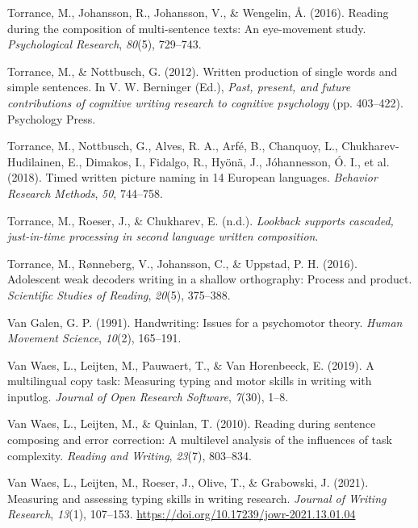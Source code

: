 \documentclass[
  man,floatsintext]{apa7}
\newlength{\cslhangindent}
\newlength{\cslentryspacingunit} %
\newenvironment{CSLReferences}[2] %
 {%
  \setlength{\parindent}{0pt}
  \ifodd #1
  \let\oldpar\par
  \def\par{\hangindent=\cslhangindent\oldpar}
  \fi
  \setlength{\parskip}{#2\cslentryspacingunit}
 }%
 {}
\begin{document}
\begin{CSLReferences}{1}{0}
\leavevmode{}%
Torrance, M., Johansson, R., Johansson, V., \& Wengelin, Å. (2016). Reading during the composition of multi-sentence texts: An eye-movement study. \emph{Psychological Research}, \emph{80}(5), 729--743.

\leavevmode{}%
Torrance, M., \& Nottbusch, G. (2012). Written production of single words and simple sentences. In V. W. Berninger (Ed.), \emph{Past, present, and future contributions of cognitive writing research to cognitive psychology} (pp. 403--422). Psychology Press.

\leavevmode{}%
Torrance, M., Nottbusch, G., Alves, R. A., Arfé, B., Chanquoy, L., Chukharev-Hudilainen, E., Dimakos, I., Fidalgo, R., Hyönä, J., Jóhannesson, Ó. I., et al. (2018). Timed written picture naming in 14 {E}uropean languages. \emph{Behavior Research Methods}, \emph{50}, 744--758.

\leavevmode{}%
Torrance, M., Roeser, J., \& Chukharev, E. (n.d.). \emph{Lookback supports cascaded, just-in-time processing in second language written composition}.

\leavevmode{}%
Torrance, M., Rønneberg, V., Johansson, C., \& Uppstad, P. H. (2016). Adolescent weak decoders writing in a shallow orthography: Process and product. \emph{Scientific Studies of Reading}, \emph{20}(5), 375--388.

\leavevmode{}%
Van Galen, G. P. (1991). Handwriting: Issues for a psychomotor theory. \emph{Human Movement Science}, \emph{10}(2), 165--191.

\leavevmode{}%
Van Waes, L., Leijten, M., Pauwaert, T., \& Van Horenbeeck, E. (2019). A multilingual copy task: Measuring typing and motor skills in writing with inputlog. \emph{Journal of Open Research Software}, \emph{7}(30), 1--8.

\leavevmode{}%
Van Waes, L., Leijten, M., \& Quinlan, T. (2010). Reading during sentence composing and error correction: A multilevel analysis of the influences of task complexity. \emph{Reading and Writing}, \emph{23}(7), 803--834.

\leavevmode{}%
Van Waes, L., Leijten, M., Roeser, J., Olive, T., \& Grabowski, J. (2021). Measuring and assessing typing skills in writing research. \emph{Journal of Writing Research}, \emph{13}(1), 107--153. \url{https://doi.org/10.17239/jowr-2021.13.01.04}


\end{CSLReferences}
\end{document}
